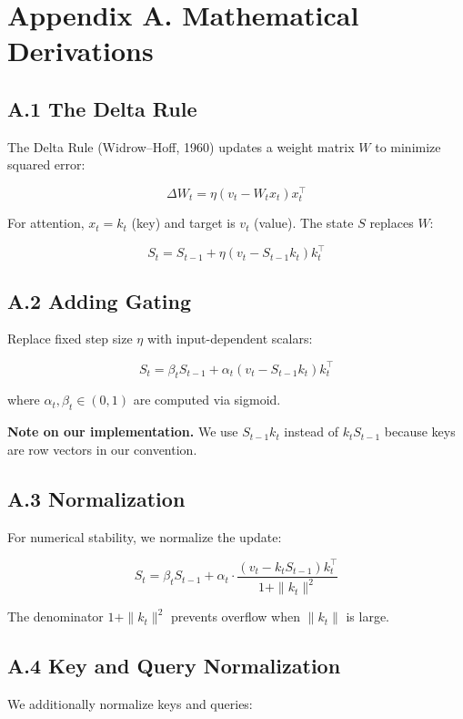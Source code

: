
\section{Appendix A. Mathematical Derivations}

\subsection{A.1 The Delta Rule}

The Delta Rule (Widrow--Hoff, 1960) updates a weight matrix $W$ to 
minimize squared error:

\[
\Delta W_t = \eta (v_t - W_t x_t) x_t^\top
\tag{A.1}
\]

For attention, $x_t = k_t$ (key) and target is $v_t$ (value). The state 
$S$ replaces $W$:

\[
S_t = S_{t-1} + \eta (v_t - S_{t-1} k_t) k_t^\top
\tag{A.2}
\]

\subsection{A.2 Adding Gating}

Replace fixed step size $\eta$ with input-dependent scalars:

\[
S_t = \beta_t S_{t-1} + \alpha_t (v_t - S_{t-1} k_t) k_t^\top
\tag{A.3}
\]

where $\alpha_t, \beta_t \in (0, 1)$ are computed via sigmoid.

\textbf{Note on our implementation.} We use $S_{t-1} k_t$ instead of $k_t S_{t-1}$ 
because keys are row vectors in our convention.

\subsection{A.3 Normalization}

For numerical stability, we normalize the update:

\[
S_t = \beta_t S_{t-1} + \alpha_t \cdot \frac{(v_t - k_t S_{t-1}) k_t^\top}{1 + \|k_t\|^2}
\tag{A.4}
\]

The denominator $1 + \|k_t\|^2$ prevents overflow when $\|k_t\|$ is large.

\subsection{A.4 Key and Query Normalization}

We additionally normalize keys and queries:

